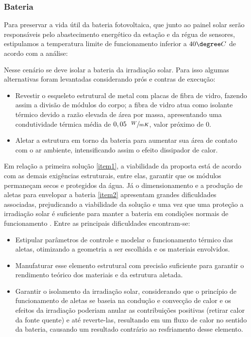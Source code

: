 \subsubsection*{Bateria}

 Para preservar a vida útil da bateria fotovoltaica, que junto ao painel solar serão responsáveis pelo abastecimento energético da estação e da régua de sensores, estipulamos a temperatura limite de funcionamento inferior a $40 \degree C$ de acordo com a análise: \cite{Freedom}
 
 Nesse cenário se deve isolar a bateria da irradiação solar. Para isso algumas alternativas foram levantadas considerando prós e contras de execução:
 
\begin{itemize}
\item Revestir o esqueleto estrutural de metal com placas de fibra de vidro, fazendo assim a divisão de módulos do corpo; a fibra de vidro atua como isolante térmico devido a razão elevada de área por massa, apresentando uma condutividade térmica média de $0,05 ~~\sfrac{W}{mK}$, valor próximo de $0$. \label{item1}
\item Aletar a estrutura em torno da bateria para aumentar sua área de contato com o ar ambiente, intensificando assim o efeito dissipador de calor. \label{item2}
\end{itemize} 

 Em relação a primeira solução \ref{item1}, a viabilidade da proposta está de acordo com as demais exigências estruturais, entre elas, garantir que os módulos permaneçam secos e protegidos da água. Já o dimensionamento e a produção de aletas para envelopar a bateria \ref{item2} apresentam grandes dificuldades associadas, prejudicando a  viabilidade da solução e uma vez que uma proteção a irradiação solar é suficiente para manter a bateria em condições normais de funcionamento \cite{Freedom}. Entre as principais dificuldades encontram-se:

\begin{itemize}
\item Estipular parâmetros de controle e modelar o funcionamento térmico das aletas, otimizando a geometria a ser escolhida e os materiais envolvidos.
\item Manufaturar esse elemento estrutural com precisão suficiente para garantir o rendimento teórico dos materiais e da estrutura aletada.
\item Garantir o isolamento da irradiação solar, considerando que o princípio de funcionamento de aletas se baseia na condução e convecção de calor e os efeitos da irradiação poderiam anular as contribuições positivas (retirar calor da fonte quente) e até reverte-las, resultando em um fluxo de calor no sentido da bateria, causando um resultado contrário ao resfriamento desse elemento.  
\end{itemize}


